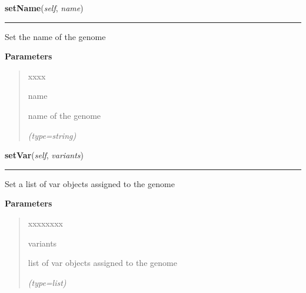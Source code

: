 \hspace{.8\funcindent}\begin{boxedminipage}{\funcwidth}

    \raggedright \textbf{setName}(\textit{self}, \textit{name})

    \vspace{-1.5ex}

    \rule{\textwidth}{0.5\fboxrule}
\setlength{\parskip}{2ex}
    Set the name of the genome

\setlength{\parskip}{1ex}
      \textbf{Parameters}
      \vspace{-1ex}

      \begin{quote}
        \begin{Ventry}{xxxx}

          \item[name]

          name of the genome

            {\it (type=string)}

        \end{Ventry}

      \end{quote}

    \end{boxedminipage}

    \label{script-phyloFixedVar:genome:setVar}

    \vspace{0.5ex}

\hspace{.8\funcindent}\begin{boxedminipage}{\funcwidth}

    \raggedright \textbf{setVar}(\textit{self}, \textit{variants})

    \vspace{-1.5ex}

    \rule{\textwidth}{0.5\fboxrule}
\setlength{\parskip}{2ex}
    Set a list of var objects assigned to the genome

\setlength{\parskip}{1ex}
      \textbf{Parameters}
      \vspace{-1ex}

      \begin{quote}
        \begin{Ventry}{xxxxxxxx}

          \item[variants]

          list of var objects assigned to the genome

            {\it (type=list)}

        \end{Ventry}

      \end{quote}

    \end{boxedminipage}

